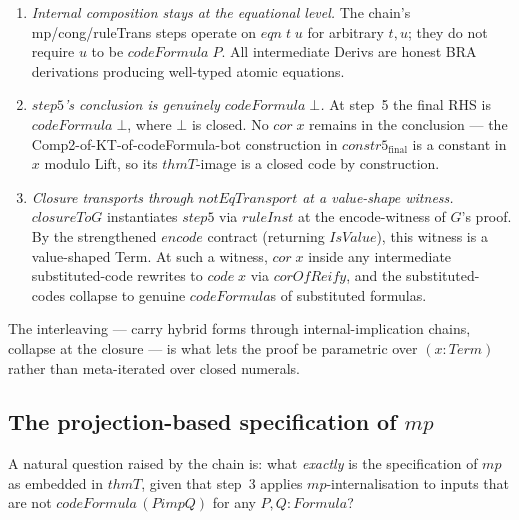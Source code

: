 \documentclass[11pt]{article}
\begin{document}
\begin{enumerate}
  \item \emph{Internal composition stays at the equational level.}
        The chain's mp/cong/ruleTrans steps operate on $\mathit{eqn}\;t\;u$
        for arbitrary $t, u$; they do not require $u$ to be
        $\mathit{codeFormula}\;P$.  All intermediate Derivs are honest
        BRA derivations producing well-typed atomic equations.
  \item \emph{$\mathit{step5}$'s conclusion is genuinely
        $\mathit{codeFormula}\;\bot$.}  At step~5 the final RHS is
        $\mathit{codeFormula}\;\bot$, where $\bot$ is closed.  No
        $\mathit{cor}\;x$ remains in the conclusion --- the
        Comp2-of-KT-of-codeFormula-bot construction in
        $\mathit{constr5}_{\mathrm{final}}$ is a constant in $x$
        modulo Lift, so its $\mathit{thmT}$-image is a closed code by
        construction.
  \item \emph{Closure transports through $\mathit{notEqTransport}$ at
        a value-shape witness.}  $\mathit{closureToG}$ instantiates
        $\mathit{step5}$ via $\mathit{ruleInst}$ at the encode-witness
        of $G$'s proof.  By the strengthened $\mathit{encode}$ contract
        (returning $\mathit{IsValue}$), this witness is a value-shaped
        Term.  At such a witness, $\mathit{cor}\;x$ inside any
        intermediate substituted-code rewrites to $\mathit{code}\;x$ via
        $\mathit{corOfReify}$, and the substituted-codes collapse to
        genuine $\mathit{codeFormula}$s of substituted formulas.
\end{enumerate}

The interleaving --- carry hybrid forms through internal-implication
chains, collapse at the closure --- is what lets the proof be
parametric over $(x : \mathit{Term})$ rather than meta-iterated over
closed numerals.

\subsection{The projection-based specification of $\mathit{mp}$}
\label{subsec:mp-projection-based-spec}

A natural question raised by the chain is: what \emph{exactly} is the
specification of $\mathit{mp}$ as embedded in $\mathit{thmT}$, given
that step~3 applies $\mathit{mp}$-internalisation to inputs that are
not $\mathit{codeFormula}\,(P \mathrel{\mathit{imp}} Q)$ for any
$P, Q : \mathit{Formula}$?
\end{document}
